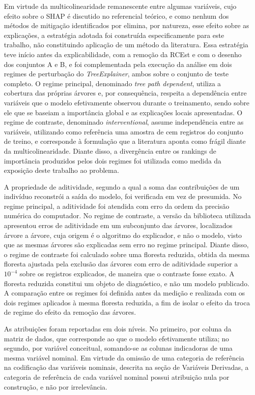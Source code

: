 Em virtude da multicolinearidade remanescente entre algumas variáveis, cujo efeito sobre o SHAP é discutido no referencial teórico, e como nenhum dos métodos de mitigação identificados por \textcite{Salih2024} elimina, por natureza, esse efeito sobre as explicações, a estratégia adotada foi construída especificamente para este trabalho, não constituindo aplicação de um método da literatura. Essa estratégia teve início antes da explicabilidade, com a remoção da RCEst e com o desenho dos conjuntos A e B, e foi complementada pela execução da análise em dois regimes de perturbação do \textit{TreeExplainer}, ambos sobre o conjunto de teste completo. O regime principal, denominado \textit{tree path dependent}, utiliza a cobertura das próprias árvores e, por consequência, respeita a dependência entre variáveis que o modelo efetivamente observou durante o treinamento, sendo sobre ele que se baseiam a importância global e as explicações locais apresentadas. O regime de contraste, denominado \textit{interventional}, assume independência entre as variáveis, utilizando como referência uma amostra de cem registros do conjunto de treino, e corresponde à formulação que a literatura aponta como frágil diante da multicolinearidade. Diante disso, a divergência entre os rankings de importância produzidos pelos dois regimes foi utilizada como medida da exposição deste trabalho ao problema.

A propriedade de aditividade, segundo a qual a soma das contribuições de um indivíduo reconstrói a saída do modelo, foi verificada em vez de presumida. No regime principal, a aditividade foi atendida com erro da ordem da precisão numérica do computador. No regime de contraste, a versão da biblioteca utilizada apresentou erros de aditividade em um subconjunto das árvores, localizados árvore a árvore, cuja origem é o algoritmo do explicador, e não o modelo, visto que as mesmas árvores são explicadas sem erro no regime principal. Diante disso, o regime de contraste foi calculado sobre uma floresta reduzida, obtida da mesma floresta ajustada pela exclusão das árvores com erro de aditividade superior a $10^{-4}$ sobre os registros explicados, de maneira que o contraste fosse exato. A floresta reduzida constitui um objeto de diagnóstico, e não um modelo publicado. A comparação entre os regimes foi definida antes da medição e realizada com os dois regimes aplicados à mesma floresta reduzida, a fim de isolar o efeito da troca de regime do efeito da remoção das árvores.

As atribuições foram reportadas em dois níveis. No primeiro, por coluna da matriz de dados, que corresponde ao que o modelo efetivamente utiliza; no segundo, por variável conceitual, somando-se as colunas indicadoras de uma mesma variável nominal. Em virtude da omissão de uma categoria de referência na codificação das variáveis nominais, descrita na seção de Variáveis Derivadas, a categoria de referência de cada variável nominal possui atribuição nula por construção, e não por irrelevância.

